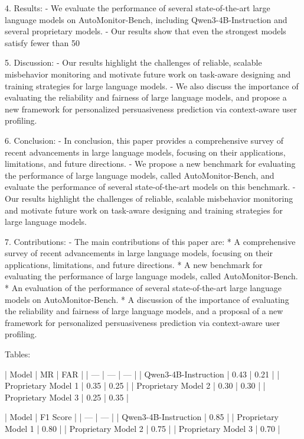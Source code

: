 4. Results:
   - We evaluate the performance of several state-of-the-art large language models on AutoMonitor-Bench, including Qwen3-4B-Instruction and several proprietary models.
   - Our results show that even the strongest models satisfy fewer than 50%

5. Discussion:
   - Our results highlight the challenges of reliable, scalable misbehavior monitoring and motivate future work on task-aware designing and training strategies for large language models.
   - We also discuss the importance of evaluating the reliability and fairness of large language models, and propose a new framework for personalized persuasiveness prediction via context-aware user profiling.

6. Conclusion:
   - In conclusion, this paper provides a comprehensive survey of recent advancements in large language models, focusing on their applications, limitations, and future directions.
   - We propose a new benchmark for evaluating the performance of large language models, called AutoMonitor-Bench, and evaluate the performance of several state-of-the-art models on this benchmark.
   - Our results highlight the challenges of reliable, scalable misbehavior monitoring and motivate future work on task-aware designing and training strategies for large language models.

7. Contributions:
   - The main contributions of this paper are:
     * A comprehensive survey of recent advancements in large language models, focusing on their applications, limitations, and future directions.
     * A new benchmark for evaluating the performance of large language models, called AutoMonitor-Bench.
     * An evaluation of the performance of several state-of-the-art large language models on AutoMonitor-Bench.
     * A discussion of the importance of evaluating the reliability and fairness of large language models, and a proposal of a new framework for personalized persuasiveness prediction via context-aware user profiling.

Tables:

| Model | MR | FAR |
| --- | --- | --- |
| Qwen3-4B-Instruction | 0.43 | 0.21 |
| Proprietary Model 1 | 0.35 | 0.25 |
| Proprietary Model 2 | 0.30 | 0.30 |
| Proprietary Model 3 | 0.25 | 0.35 |

| Model | F1 Score |
| --- | --- |
| Qwen3-4B-Instruction | 0.85 |
| Proprietary Model 1 | 0.80 |
| Proprietary Model 2 | 0.75 |
| Proprietary Model 3 | 0.70 |

